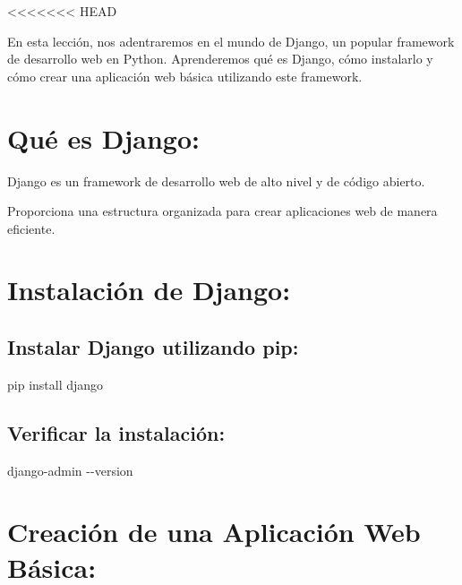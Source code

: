 \documentclass[
  a4paper,
  DIV=11,
  numbers=noendperiod,
  onepage,
  openany]{scrreprt}
\newenvironment{Shaded}{\begin{snugshade}}{\end{snugshade}}
\newcommand{\AttributeTok}[1]{\textcolor[rgb]{0.40,0.45,0.13}{#1}}
\newcommand{\ExtensionTok}[1]{\textcolor[rgb]{0.00,0.23,0.31}{#1}}
\newcommand{\NormalTok}[1]{\textcolor[rgb]{0.00,0.23,0.31}{#1}}
\begin{document}
\textless\textless\textless\textless\textless\textless\textless{} HEAD

En esta lección, nos adentraremos en el mundo de Django, un popular
framework de desarrollo web en Python. Aprenderemos qué es Django, cómo
instalarlo y cómo crear una aplicación web básica utilizando este
framework.

\hypertarget{quuxe9-es-django}{%
\section{Qué es Django:}\label{quuxe9-es-django}}

Django es un framework de desarrollo web de alto nivel y de código
abierto.

Proporciona una estructura organizada para crear aplicaciones web de
manera eficiente.

\hypertarget{instalaciuxf3n-de-django}{%
\section{Instalación de Django:}\label{instalaciuxf3n-de-django}}

\hypertarget{instalar-django-utilizando-pip}{%
\subsection{Instalar Django utilizando
pip:}\label{instalar-django-utilizando-pip}}

\begin{Shaded}
\begin{Highlighting}[]
\ExtensionTok{pip}\NormalTok{ install django}
\end{Highlighting}
\end{Shaded}

\hypertarget{verificar-la-instalaciuxf3n}{%
\subsection{Verificar la
instalación:}\label{verificar-la-instalaciuxf3n}}

\begin{Shaded}
\begin{Highlighting}[]
\ExtensionTok{django{-}admin} \AttributeTok{{-}{-}version}
\end{Highlighting}
\end{Shaded}

\hypertarget{creaciuxf3n-de-una-aplicaciuxf3n-web-buxe1sica}{%
\section{Creación de una Aplicación Web
Básica:}\label{creaciuxf3n-de-una-aplicaciuxf3n-web-buxe1sica}}
\end{document}
